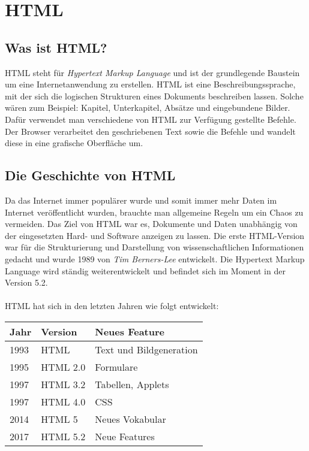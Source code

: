 \section{HTML}
\label{html}

\subsection{Was ist HTML?}
HTML steht für \textit{Hypertext Markup Language} und ist der grundlegende Baustein um eine
Internetanwendung zu erstellen. HTML ist eine Beschreibungssprache, mit der sich die logischen
Strukturen eines Dokuments beschreiben lassen. Solche wären zum Beispiel: Kapitel, Unterkapitel,
Absätze und eingebundene Bilder. Dafür verwendet man verschiedene von HTML zur Verfügung gestellte
Befehle. Der Browser verarbeitet den geschriebenen Text sowie die Befehle und wandelt diese in
eine grafische Oberfläche um.

\subsection{Die Geschichte von HTML}
Da das Internet immer populärer wurde und somit immer mehr Daten im Internet veröffentlicht wurden, 
brauchte man allgemeine Regeln um ein Chaos zu vermeiden. Das Ziel von HTML war es, Dokumente und 
Daten unabhängig von der eingesetzten Hard- und Software anzeigen zu lassen. 
Die erste HTML-Version war für die Strukturierung und Darstellung von wissenschaftlichen 
Informationen gedacht und wurde 1989 von \textit{Tim Berners-Lee} entwickelt. Die Hypertext Markup 
Language wird ständig weiterentwickelt und befindet sich im Moment in der Version 5.2. 
~\cite{geschichteHTML}
\\
\\
\newpage
HTML hat sich in den letzten Jahren wie folgt entwickelt:
\begin{center}
    \begin{table}[H]
        \centering
        \begin{tabular}{|l|l|l|} \hline
            {\textbf{Jahr}} & {\textbf{Version}} & {\textbf{Neues Feature}} \\ \hline
            1993                & HTML                   & Text und Bildgeneration      \\ \hline
            1995                & HTML 2.0               & Formulare                    \\ \hline
            1997                & HTML 3.2               & Tabellen, Applets            \\ \hline
            1997                & HTML 4.0               & CSS                          \\ \hline
            2014                & HTML 5                 & Neues Vokabular              \\ \hline
            2017                & HTML 5.2               & Neue Features               \\ \hline
        \end{tabular}
    \end{table}
\end{center}